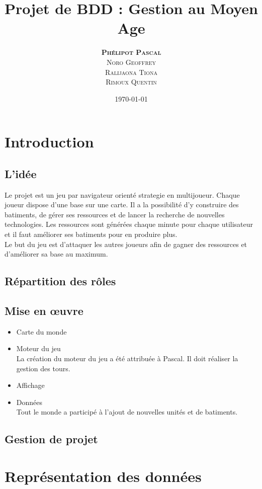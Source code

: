 \documentclass[11pt,a4paper]{article}
\author{\textsc{\textbf{Phélipot Pascal}}\\\textsc{Noro Geoffrey}\\\textsc{Ralijaona Tiona}\\\textsc{Rimoux Quentin}}
\title{Projet de BDD : Gestion au Moyen Age}
\date\today
\begin{document}
\maketitle
\pagestyle{plain}
\newpage{}
\tableofcontents

\newpage{}
\section{Introduction}
\subsection{L'idée}
Le projet est un jeu par navigateur orienté strategie en multijoueur. 
Chaque joueur dispose d'une base sur une carte. Il a la possibilité d'y construire des batiments, de gérer ses ressources et de lancer la recherche de nouvelles technologies.
Les ressources sont générées chaque minute pour chaque utilisateur et il faut améliorer ses batiments pour en produire plus. \\
Le but du jeu est d'attaquer les autres joueurs afin de gagner des ressources et d'améliorer sa base au maximum. \\


\subsection{Répartition des rôles}
\subsection{Mise en œuvre}
\begin{itemize}
	\item Carte du monde 
	\item Moteur du jeu \\
	La création du moteur du jeu a été attribuée à Pascal. Il doit réaliser la gestion des tours.
	\item Affichage

	\item Données \\
	Tout le monde a participé à l'ajout de nouvelles unités et de batiments.
\end{itemize}
\subsection{Gestion de projet}

\newpage\section{Représentation des données}
\end{document}
